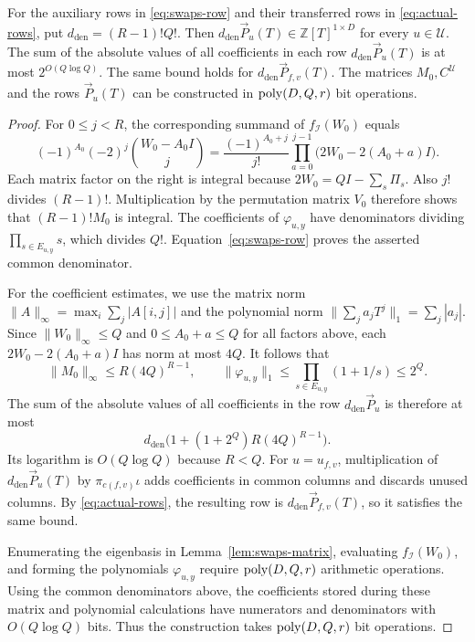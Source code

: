\begin{lemma}\label{lem:row-coefficients}
For the auxiliary rows in \eqref{eq:swaps-row} and their transferred
rows in \eqref{eq:actual-rows}, put $d_{\mathrm{den}}=(R-1)!Q!$. Then
$d_{\mathrm{den}}\vec{P}_u(T)\in\mathbb Z[T]^{1\times D}$ for every $u\in\mathcal U$. The sum of the absolute values of all coefficients
in each row $d_{\mathrm{den}}\vec{P}_u(T)$ is at most $2^{O(Q\log Q)}$.
The same bound holds for $d_{\mathrm{den}}\vec{P}_{f,v}(T)$.
The matrices $M_0,C^{\mathcal U}$ and the rows $\vec{P}_u(T)$ can be
constructed in $\operatorname{poly}(D,Q,r)$ bit operations.
\end{lemma}
\begin{proof}
For $0\le j<R$, the corresponding summand of
$f_{\mathcal I}(W_0)$ equals
\[
 (-1)^{A_0}(-2)^j\binom{W_0-A_0I}{j}
 =\frac{(-1)^{A_0+j}}{j!}
   \prod_{a=0}^{j-1}\bigl(2W_0-2(A_0+a)I\bigr).
\]
Each matrix factor on the right is integral because
$2W_0=QI-\sum_s\Pi_s$. Also $j!$ divides $(R-1)!$.
Multiplication by the permutation matrix $V_0$ therefore shows that
$(R-1)!M_0$ is integral. The coefficients of $\varphi_{u,y}$ have
denominators dividing $\prod_{s\in E_{u,y}}s$, which divides $Q!$.
Equation~\eqref{eq:swaps-row} proves the asserted common denominator.

For the coefficient estimates, we use the matrix norm
$\|A\|_\infty=\max_i\sum_j|A[i,j]|$ and
the polynomial norm $\|\sum_j a_jT^j\|_1=\sum_j|a_j|$.
Since $\|W_0\|_\infty\le Q$ and $0\le A_0+a\le Q$ for all
factors above, each $2W_0-2(A_0+a)I$ has norm at most $4Q$.
It follows that
\[
 \|M_0\|_\infty\le R(4Q)^{R-1},\qquad
 \|\varphi_{u,y}\|_1
 \le\prod_{s\in E_{u,y}}(1+1/s)\le2^Q.
\]
The sum of the absolute values of all coefficients in the row
$d_{\mathrm{den}}\vec{P}_u$ is therefore at most
\[
 d_{\mathrm{den}}\bigl(1+(1+2^Q)R(4Q)^{R-1}\bigr).
\]
Its logarithm is $O(Q\log Q)$ because $R<Q$.
For $u=u_{f,v}$, multiplication of $d_{\mathrm{den}}\vec{P}_u(T)$ by
$\pi_{c(f,v)}\iota$ adds coefficients in common columns and discards
unused columns. By \eqref{eq:actual-rows}, the resulting row is
$d_{\mathrm{den}}\vec{P}_{f,v}(T)$, so it satisfies the same bound.

Enumerating the eigenbasis in Lemma~\ref{lem:swaps-matrix}, evaluating
$f_{\mathcal I}(W_0)$, and forming the polynomials $\varphi_{u,y}$
require $\operatorname{poly}(D,Q,r)$ arithmetic operations. Using the common
denominators above, the coefficients stored during these matrix
and polynomial calculations have numerators and denominators with
$O(Q\log Q)$ bits. Thus the construction takes $\operatorname{poly}(D,Q,r)$ bit
operations.
\end{proof}

